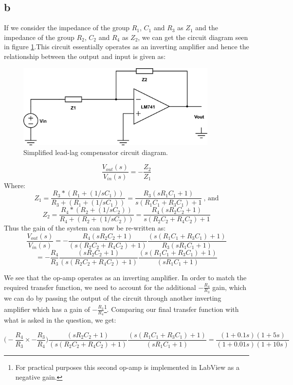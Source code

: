 \documentclass{article}
\theoremstyle{plain}
\theoremstyle{definition}
\theoremstyle{remark}
\begin{document}
\subsection*{b}
If we consider the impedance of the group $R_1$, $C_1$ and $R_3$ as $Z_1$ and the impedance of the group  $R_2$, $C_2$ and $R_4$ as $Z_2$, we can get the circuit diagram seen in figure \ref{q1_b}.This circuit essentially operates as an inverting amplifier and hence the relationship between the output and input is given as:
\begin{figure}[h]
\begin{center}
\includegraphics[width=10cm]{revised-lead-lag-simplified.png}
\end{center}
\caption{Simplified lead-lag compensator circuit diagram.}
\label{q1_b}
\end{figure}
 

$$\frac{V_{out}(s)}{V_{in}(s)} = - \frac{Z_2}{Z_1}$$
Where:
$$Z_1 = \frac{R_3 * (R_1 + (1/sC_1))}{R_3 + (R_1 + (1/sC_1))} = \frac{R_3(sR_1C_1 +1)}{s(R_1C_1 + R_3C_1) + 1} \ \text{, and}$$
$$Z_2 = \frac{R_4 * (R_2 + (1/sC_2))}{R_4 + (R_2 + (1/sC_2))} = \frac{R_4(sR_2C_2 +1)}{s(R_2C_2 + R_4C_2) + 1}$$
Thus the gain of the system can now be re-written as:
$$\frac{V_{out}(s)}{V_{in}(s)} = -  \frac{R_4(sR_2C_2 +1)}{(s(R_2C_2 + R_4C_2) + 1)}\frac{(s(R_1C_1 + R_3C_1) + 1)}{R_3(sR_1C_1 +1)} $$
$$=  -  \frac{R_4}{R_3}\frac{(sR_2C_2 +1)}{(s(R_2C_2 + R_4C_2) + 1)}\frac{(s(R_1C_1 + R_3C_1) + 1)}{(sR_1C_1 +1)} $$

We see that the op-amp operates as an inverting amplifier. In order to match the required transfer function, we need to account for the additional $-\frac{R_4}{R_3}$ gain, which we can do by passing the output of the circuit through another inverting amplifier which has a gain of $-\frac{R_3}{R_4}$\footnote{For practical purposes this second op-amp is implemented in LabView as a negative gain.}. Comparing our final transfer function with what is asked in the question, we get:

$$\Big( -  \frac{R_4}{R_3} \times -\frac{R_3}{R_4} \Big)\frac{(sR_2C_2 +1)}{(s(R_2C_2 + R_4C_2) + 1)}\frac{(s(R_1C_1 + R_3C_1) + 1)}{(sR_1C_1 +1)}  = \frac{(1+0.1s)(1 + 5s)}{(1+0.01s)(1 + 10s)}$$
\end{document}
